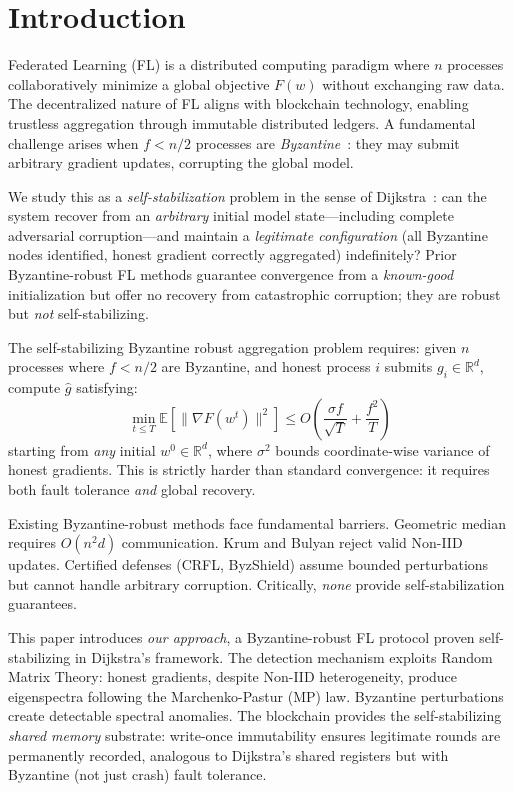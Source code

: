\documentclass[runningheads]{llncs}
\begin{document}

\section{Introduction}

Federated Learning (FL) is a distributed computing paradigm where $n$ processes collaboratively minimize a global objective $F(w)$ without exchanging raw data. The decentralized nature of FL aligns with blockchain technology, enabling trustless aggregation through immutable distributed ledgers. A fundamental challenge arises when $f < n/2$ processes are \emph{Byzantine}~\cite{byzantine_generals}: they may submit arbitrary gradient updates, corrupting the global model.

We study this as a \emph{self-stabilization} problem in the sense of Dijkstra~\cite{dijkstra_self_stab}: can the system recover from an \emph{arbitrary} initial model state---including complete adversarial corruption---and maintain a \emph{legitimate configuration} (all Byzantine nodes identified, honest gradient correctly aggregated) indefinitely? Prior Byzantine-robust FL methods guarantee convergence from a \emph{known-good} initialization but offer no recovery from catastrophic corruption; they are robust but \emph{not} self-stabilizing.

The self-stabilizing Byzantine robust aggregation problem requires: given $n$ processes where $f < n/2$ are Byzantine, and honest process $i$ submits $g_i \in \mathbb{R}^d$, compute $\hat{g}$ satisfying:
\begin{equation}
\min_{t \leq T}\mathbb{E}[\|\nabla F(w^t)\|^2] \leq O\left(\frac{\sigma f}{\sqrt{T}} + \frac{f^2}{T}\right)
\end{equation}
starting from \emph{any} initial $w^0 \in \mathbb{R}^d$, where $\sigma^2$ bounds coordinate-wise variance of honest gradients. This is strictly harder than standard convergence: it requires both fault tolerance \emph{and} global recovery.

Existing Byzantine-robust methods face fundamental barriers. Geometric median requires $O(n^2 d)$ communication. Krum and Bulyan reject valid Non-IID updates. Certified defenses (CRFL, ByzShield) assume bounded perturbations but cannot handle arbitrary corruption. Critically, \emph{none} provide self-stabilization guarantees.

This paper introduces \emph{our approach}, a Byzantine-robust FL protocol proven self-stabilizing in Dijkstra's framework. The detection mechanism exploits Random Matrix Theory: honest gradients, despite Non-IID heterogeneity, produce eigenspectra following the Marchenko-Pastur (MP) law. Byzantine perturbations create detectable spectral anomalies. The blockchain provides the self-stabilizing \emph{shared memory} substrate: write-once immutability ensures legitimate rounds are permanently recorded, analogous to Dijkstra's shared registers but with Byzantine (not just crash) fault tolerance.
\end{document}

